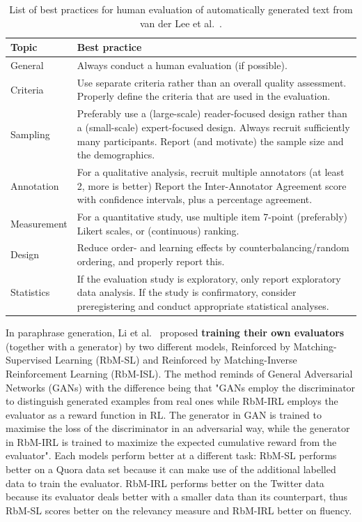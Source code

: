 \documentclass[11pt]{article}
\begin{document}
\begin{table}[h!]
\begin{center}
\begin{tabular}{m{7em}m{12cm}}
 \textbf{Topic} & \textbf{Best practice}  \\ \hline
 General & Always conduct a human evaluation (if possible).  \\  \hline
 Criteria & Use separate criteria rather than an overall quality assessment.
Properly define the criteria that are used in the evaluation. \\\hline
Sampling & Preferably use a (large-scale) reader-focused design rather than a (small-scale) expert-focused design.
Always recruit sufficiently many participants. Report (and motivate) the sample size and the demographics. \\\hline
Annotation &  For a qualitative analysis, recruit multiple annotators (at least 2, more is better)
Report the Inter-Annotator Agreement score with confidence intervals, plus a percentage agreement. \\\hline
Measurement & For a quantitative study, use multiple item 7-point (preferably) Likert scales, or (continuous) ranking. \\\hline
Design &  Reduce order- and learning effects by counterbalancing/random ordering, and properly report this. \\\hline
Statistics & If the evaluation study is exploratory, only report exploratory data analysis.
If the study is confirmatory, consider preregistering and conduct appropriate statistical analyses.
\end{tabular}
\caption{List of best practices for human evaluation of automatically generated text from van der Lee et al.~.}
\label{table:1}
\end{center}
\end{table}

In paraphrase generation, Li et al.~ proposed \textbf{training their own evaluators} (together with a generator) by two different models, Reinforced by Matching-Supervised Learning (RbM-SL) and Reinforced by Matching-Inverse Reinforcement Learning (RbM-ISL). The method reminds of General Adversarial Networks (GANs) with the difference being that "GANs employ the discriminator to distinguish generated examples from real ones while RbM-IRL employs the evaluator as a reward function in RL. The generator in GAN is trained to maximise the loss of the discriminator in an adversarial way, while the generator in RbM-IRL is trained to maximize the expected cumulative reward from the evaluator". Each models perform better at a different task: RbM-SL performs better on a Quora data set because it can make use of the additional labelled data to train the evaluator. RbM-IRL performs better on the Twitter data because its evaluator deals better with a smaller data than its counterpart, thus RbM-SL scores better on the relevancy measure and RbM-IRL better on fluency.
\end{document}
